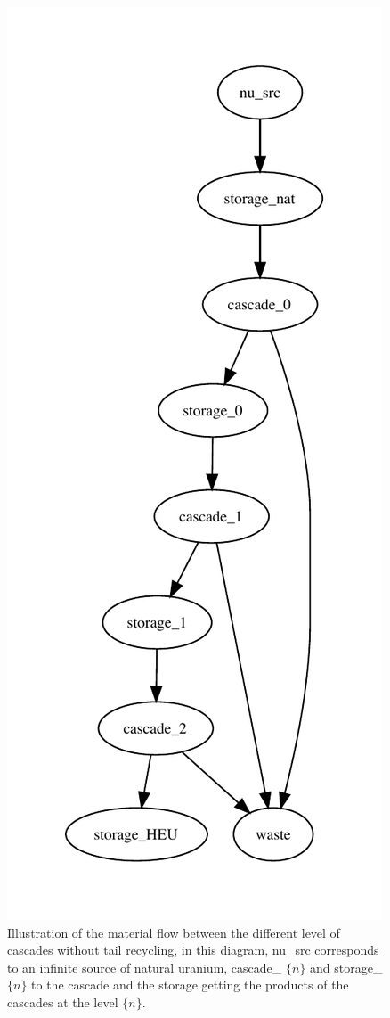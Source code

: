 \documentclass{anstrans}
\begin{document}
\begin{figure}[ht]
  \includegraphics[scale=0.68]{flow_case_2_no_recy.pdf}
  \caption{Illustration of the material flow between the different level of
      cascades without tail recycling, in this diagram, nu\_src corresponds to
      an infinite source of natural uranium, cascade\_ $\{n\}$ and storage\_
      $\{n\}$ to the cascade and the storage getting the products of the
      cascades at the level $\{n\}$.}\label{fig:flow}
\end{figure}
\end{document}

